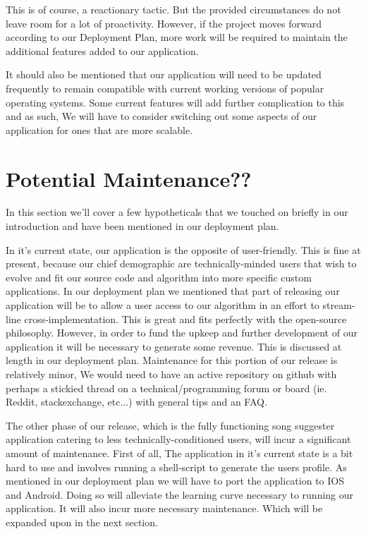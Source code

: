 \documentclass{roffin}
\begin{document}
This is of course, a reactionary tactic. But the provided circumstances do not leave room for a lot of proactivity. However, if the project moves forward according to our Deployment Plan, more work will be required to maintain the additional features added to our application. 

It should also be mentioned that our application will need to be updated frequently to remain compatible with current working versions of popular operating systems. Some current features will add further complication to this and as such, We will have to consider switching out some aspects of our application for ones that are more scalable. 


\section{Potential Maintenance??}

In this section we'll cover a few hypotheticals that we touched on briefly in our introduction and have been mentioned in our deployment plan. 

In it's current state, our application is the opposite of user-friendly. This is fine at present, because our chief demographic are technically-minded users that wish to evolve and fit our source code and algorithm into more specific custom applications. In our deployment plan we mentioned that part of releasing our application will be to allow a user access to our algorithm in an effort to stream-line cross-implementation. This is great and fits perfectly with the open-source philosophy. However, in order to fund the upkeep and further development of our application it will be necessary to generate some revenue. This is discussed at length in our deployment plan. Maintenance for this portion of our release is relatively minor, We would need to have an active repository on github with perhaps a stickied thread on a technical/programming forum or board (ie. Reddit, stackexchange, etc...) with general tips and an FAQ.

The other phase of our release, which is the fully functioning song suggester application catering to less technically-conditioned users, will incur a significant amount of maintenance. First of all, The application in it's current state is a bit hard to use and involves running a shell-script to generate the users profile. As mentioned in our deployment plan we will have to port the application to IOS and Android. Doing so will alleviate the learning curve necessary to running our application. It will also incur more necessary maintenance. Which will be expanded upon in the next section. 
\end{document}
